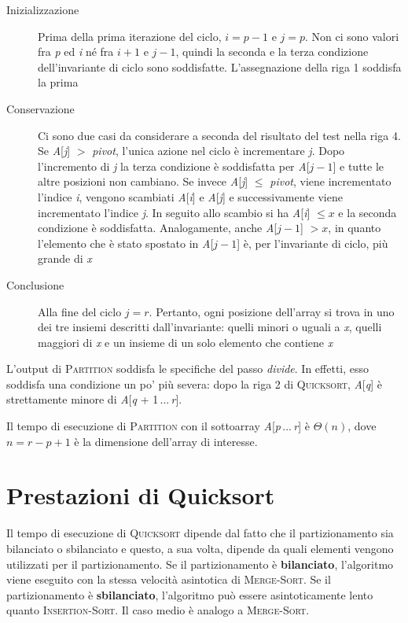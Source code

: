\documentclass[10pt, a4paper]{report}
\begin{document}
\begin{description}
\item[Inizializzazione]Prima della prima iterazione del ciclo, $i = p - 1$ e $j = p$. Non ci sono valori fra \textit{p} ed \textit{i} né fra $i + 1$ e $j - 1$, quindi la seconda e la terza condizione dell'invariante di ciclo sono soddisfatte. L'assegnazione della riga 1 soddisfa la prima
\item[Conservazione]Ci sono due casi da considerare a seconda del risultato del test nella riga 4. Se \textit{A}[\textit{j}] $>$ \textit{pivot}, l'unica azione nel ciclo è incrementare \textit{j}. Dopo l'incremento di \textit{j} la terza condizione è soddisfatta per \textit{A}[$j - 1$] e tutte le altre posizioni non cambiano. Se invece \textit{A}[\textit{j}] $\leq$ \textit{pivot}, viene incrementato l'indice \textit{i}, vengono scambiati \textit{A}[\textit{i}] e \textit{A}[\textit{j}] e successivamente viene incrementato l'indice \textit{j}. In seguito allo scambio si ha \textit{A}[\textit{i}] $\leq x$ e la seconda condizione è soddisfatta. Analogamente, anche \textit{A}[$j - 1$] $> x$, in quanto l'elemento che è stato spostato in \textit{A}[$j - 1$] è, per l'invariante di ciclo, più grande di \textit{x}
\item[Conclusione]Alla fine del ciclo $j = r$. Pertanto, ogni posizione dell'array si trova in uno dei tre insiemi descritti dall'invariante: quelli minori o uguali a \textit{x}, quelli maggiori di \textit{x} e un insieme di un solo elemento che contiene \textit{x}
\end{description}
L'output di \textsc{Partition} soddisfa le specifiche del passo \textsl{divide}. In effetti, esso soddisfa una condizione un po' più severa: dopo la riga 2 di \textsc{Quicksort}, \textit{A}[\textit{q}] è strettamente minore di \textit{A}[\textit{q} + 1\,...\,\textit{r}].

Il tempo di esecuzione di \textsc{Partition} con il sottoarray \textit{A}[\textit{p}\,...\,\textit{r}] è $\Theta(n)$, dove $n = r - p + 1$ è la dimensione dell'array di interesse.
\section{Prestazioni di Quicksort}
Il tempo di esecuzione di \textsc{Quicksort} dipende dal fatto che il partizionamento sia bilanciato o sbilanciato e questo, a sua volta, dipende da quali elementi vengono utilizzati per il partizionamento. Se il partizionamento è \textbf{bilanciato}, l'algoritmo viene eseguito con la stessa velocità asintotica di \textsc{Merge-Sort}. Se il partizionamento è \textbf{sbilanciato}, l'algoritmo può essere asintoticamente lento quanto \textsc{Insertion-Sort}. Il caso medio è analogo a \textsc{Merge-Sort}.
\end{document}
